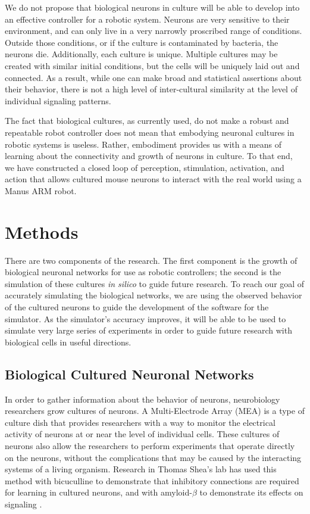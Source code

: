 \documentclass[letterpaper]{article}
\begin{document}
We do not propose that biological neurons in culture will be able to develop into an effective controller for a robotic system.
Neurons are very sensitive to their environment, and can only live in a very narrowly proscribed range of conditions. 
Outside those conditions, or if the culture is contaminated by bacteria, the neurons die. 
Additionally, each culture is unique. Multiple cultures may be created with similar initial conditions, but the cells will be uniquely laid out and connected. 
As a result, while one can make broad and statistical assertions about their behavior, there is not a high level of inter-cultural similarity at the level of individual signaling patterns. 

The fact that biological cultures, as currently used, do not make a robust and repeatable robot controller does not mean that embodying neuronal cultures in robotic systems is useless. 
Rather, embodiment provides us with a means of learning about the connectivity and growth of neurons in culture. 
To that end, we have constructed a closed loop of perception, stimulation, activation, and action that allows cultured mouse neurons to interact with the real world using a Manus ARM robot.

\section{Methods}

There are two components of the research. 
The first component is the growth of biological neuronal networks for use as robotic controllers; the second is the simulation of these cultures \textit{in silico} to guide future research. 
To reach our goal of accurately simulating the biological networks, we are using the observed behavior of the cultured neurons to guide the development of the software for the simulator.
As the simulator's accuracy improves, it will be able to be used to simulate very large series of experiments in order to guide future research with biological cells in useful directions. 

\subsection{Biological Cultured Neuronal Networks}

In order to gather information about the behavior of neurons, neurobiology researchers grow cultures of neurons.
A Multi-Electrode Array (MEA) is a type of culture dish that provides researchers with a way to monitor the electrical activity of neurons at or near the level of individual cells. 
These cultures of neurons also allow the researchers to perform experiments that operate directly on the neurons, without the complications that may be caused by the interacting systems of a living organism. 
Research in Thomas Shea's lab has used this method with bicuculline to demonstrate that inhibitory connections are required for learning in cultured neurons, and with amyloid-$\beta$ to demonstrate its effects on signaling \cite{lee2013rapid,shea2009optimization}. 
\end{document}
